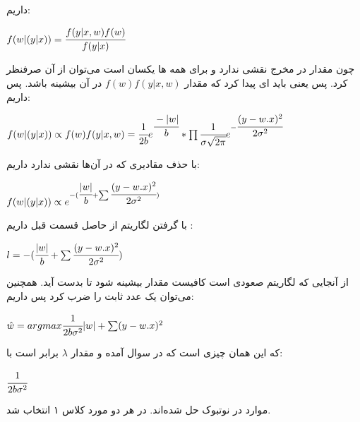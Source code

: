 \documentclass[a4paper,14pt]{extarticle}
\begin{document}
	داریم:
	\begin{latin}
		$
		f(w | (y | x)) = \cfrac{f(y | x, w) f(w)}{f(y | x)}
		$
	\end{latin}
	چون مقدار 
	در مخرج نقشی ندارد و برای همه 
	ها یکسان است می‌توان از آن صرفنظر کرد. پس یعنی باید 
	ای پیدا کرد که مقدار 
	$f(w)f(y | x, w)$
	در آن بیشینه باشد. پس داریم:
	\begin{latin}
		$
		f(w | (y|x)) \propto f(w)f(y | x, w) = \cfrac{1}{2b} e^{\cfrac{-|w|}{b}} * \prod \cfrac{1}{\sigma \sqrt{2\pi}} e^{-\cfrac{(y - w.x)^2}{2\sigma^2}}
		$
	\end{latin}
	با حذف مقادیری که 
	در آن‌ها نقشی ندارد داریم:
	\begin{latin}
		$
		f(w | (y | x)) \propto e^{-(\cfrac{|w|}{b} + \sum  \cfrac{(y - w.x)^2}{2\sigma^2})}
		$
	\end{latin}
		با گرفتن لگاریتم از حاصل قسمت قبل داریم :
		\begin{latin}
			$
			l = -(\cfrac{|w|}{b} + \sum  \cfrac{(y - w.x)^2}{2\sigma^2})
			$
		\end{latin}
		از آنجایی که لگاریتم صعودی است کافیست مقدار 
		بیشینه شود تا 
		بدست آید. همچنین می‌توان یک عدد ثابت را ضرب کرد پس داریم:
		\begin{latin}
			$
		\hat{w} = argmax \cfrac{1}{2b\sigma^2} |w| + \sum (y - w.x)^2
			$
		\end{latin}
		که این همان چیزی است که در سوال آمده و مقدار 
		$\lambda$
		برابر است با:
		\begin{latin}
			$
			\cfrac{1}{2b\sigma^2}
			$
		\end{latin}
	موارد در نوتبوک 
	حل شده‌اند. در هر دو مورد کلاس ۱ انتخاب شد. 
\end{document}
